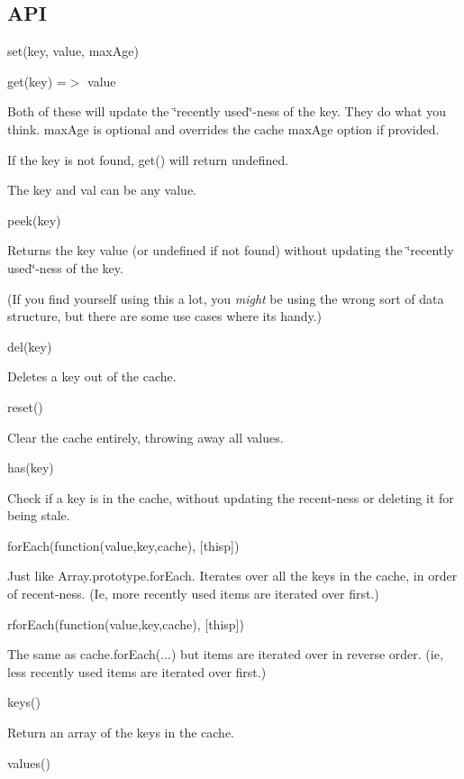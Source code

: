 \subsection*{A\+PI}


\begin{DoxyItemize}
\item {\ttfamily set(key, value, max\+Age)}
\item {\ttfamily get(key) =$>$ value}

Both of these will update the \char`\"{}recently used\char`\"{}-\/ness of the key. They do what you think. {\ttfamily max\+Age} is optional and overrides the cache {\ttfamily max\+Age} option if provided.

If the key is not found, {\ttfamily get()} will return {\ttfamily undefined}.

The key and val can be any value.
\item {\ttfamily peek(key)}

Returns the key value (or {\ttfamily undefined} if not found) without updating the \char`\"{}recently used\char`\"{}-\/ness of the key.

(If you find yourself using this a lot, you {\itshape might} be using the wrong sort of data structure, but there are some use cases where it\textquotesingle{}s handy.)
\item {\ttfamily del(key)}

Deletes a key out of the cache.
\item {\ttfamily reset()}

Clear the cache entirely, throwing away all values.
\item {\ttfamily has(key)}

Check if a key is in the cache, without updating the recent-\/ness or deleting it for being stale.
\item {\ttfamily for\+Each(function(value,key,cache), \mbox{[}thisp\mbox{]})}

Just like {\ttfamily Array.\+prototype.\+for\+Each}. Iterates over all the keys in the cache, in order of recent-\/ness. (Ie, more recently used items are iterated over first.)
\item {\ttfamily rfor\+Each(function(value,key,cache), \mbox{[}thisp\mbox{]})}

The same as {\ttfamily cache.\+for\+Each(...)} but items are iterated over in reverse order. (ie, less recently used items are iterated over first.)
\item {\ttfamily keys()}

Return an array of the keys in the cache.
\item {\ttfamily values()}


\end{DoxyItemize}
